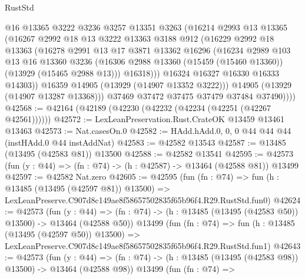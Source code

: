 \begin{lexlean}{RustStd}
\begin{coremodule}
                @16
                @13365
                @3222
                @3236
                @3257
                @13351
                @3263
                (@16214
                  @2993
                  @13
                  @13365
                  (@16267
                    @2992
                    @18
                    @13
                    @3222
                    @13363
                    @3188
                    @912
                    (@16229
                      @2992
                      @18
                      @13363
                      (@16278
                        @2991
                        @13
                        @17
                        @3871
                        @13362
                        @16296
                        (@16234
                          @2989
                          @103
                          @13
                          @16
                          @13360
                          @3236
                          (@16306 @2988 @13360 (@15459 (@15460 @13360)) (@13929 (@15465 @2988 @13)))
                          @16318)))
                    @16324
                    @16327
                    @16330
                    @16333
                    @14303))
                @16359
                @14905
                (@13929 (@14907 @13352 @3222)))
              @14905
              (@13929 (@14907 @13287 @13368)))
            @37469
            @37472
            @37475
            @37479
            @37484
            @37490))))
@42568 := @42164 (@42189 (@42230 (@42232 (@42234 (@42251 (@42267 @42561))))))
@42572 := LexLeanPreservation.Rust.CrateOK @13459 @13461 @13463
@42573 := Nat.casesOn.{0}
@42582 := HAdd.hAdd.{0, 0, 0} @44 @44 @44 (instHAdd.{0} @44 instAddNat)
@42583 := @42582 @13543
@42587 := @13485 (@13495 (@42583 @81)) @13500
@42588 := @42582 @13541
@42595 := @42573 (fun (y : @44) => (fn : @74) -> (h : @42587) -> @13464 (@42588 @81)) @13499
@42597 := @42582 Nat.zero
@42605 := @42595
    (fun (fn : @74) =>
    fun (h : @13485 (@13495 (@42597 @81)) @13500) =>
    LexLeanPreserve.C907d8c149ae8f58657502835f65b96f4.R29.RustStd.fun0)
@42624 := @42573
    (fun (y : @44) =>
    (fn : @74) -> (h : @13485 (@13495 (@42583 @50)) @13500) -> @13464 (@42588 @50))
    @13499
    (fun (fn : @74) =>
    fun (h : @13485 (@13495 (@42597 @50)) @13500) =>
    LexLeanPreserve.C907d8c149ae8f58657502835f65b96f4.R29.RustStd.fun1)
@42643 := @42573
    (fun (y : @44) =>
    (fn : @74) -> (h : @13485 (@13495 (@42583 @98)) @13500) -> @13464 (@42588 @98))
    @13499
    (fun (fn : @74) =>

\end{coremodule}
\end{lexlean}
